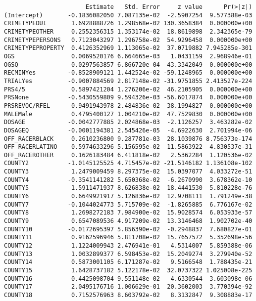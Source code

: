 \documentclass[
  letterpaper,
  DIV=11,
  numbers=noendperiod]{scrartcl}
\begin{document}
\begin{verbatim}
                       Estimate   Std. Error     z value      Pr(>|z|)
(Intercept)       -0.1836082050 7.087135e-02  -2.5907254  9.577388e-03
CRIMETYPEDUI       1.6928888726 1.298568e-02 130.3658384  0.000000e+00
CRIMETYPEOTHER     0.2552356315 1.353174e-02  18.8619898  2.342365e-79
CRIMETYPEPERSONS   0.7123043297 1.296758e-02  54.9296458  0.000000e+00
CRIMETYPEPROPERTY  0.4126352969 1.113065e-02  37.0719882 7.945285e-301
OGS                0.0069520176 6.664665e-03   1.0431159  2.968946e-01
OGSQ               0.0297563857 6.866720e-04  43.3342049  0.000000e+00
RECMINYes         -0.8528909121 1.442524e-02 -59.1248965  0.000000e+00
TRIALYes          -0.9007884569 2.817148e-02 -31.9751855 2.413527e-224
PRS4/5             0.5897421204 1.276206e-02  46.2105905  0.000000e+00
PRSNone           -0.5430559809 9.594326e-03 -56.6017874  0.000000e+00
PRSREVOC/RFEL      0.9491943978 2.484836e-02  38.1994827  0.000000e+00
MALEMale           0.4795400127 1.004210e-02  47.7529830  0.000000e+00
DOSAGE            -0.0042777885 2.024868e-03  -2.1126257  3.463282e-02
DOSAGEQ           -0.0001194381 2.545426e-05  -4.6922630  2.701994e-06
OFF_RACERBLACK     0.2610236800 9.287781e-03  28.1039876 8.756373e-174
OFF_RACERLATINO    0.5974633296 5.156595e-02  11.5863922  4.830537e-31
OFF_RACEROTHER     0.1626183484 6.411818e-02   2.5362284  1.120536e-02
COUNTY2           -1.0145125525 4.715457e-02 -21.5146182 1.136108e-102
COUNTY3            1.2479009459 8.297375e-02  15.0397077  4.033272e-51
COUNTY4           -0.3541141282 5.650368e-02  -6.2670990  3.678362e-10
COUNTY5            1.5911471937 8.626838e-02  18.4441530  5.810228e-76
COUNTY6            0.6649921917 5.126836e-02  12.9708111  1.791249e-38
COUNTY7           -0.1044024773 5.715709e-02  -1.8265885  6.776167e-02
COUNTY8            1.2698272183 7.984900e-02  15.9028574  6.053933e-57
COUNTY9            0.6547089536 4.917209e-02  13.3146468  1.902702e-40
COUNTY10          -0.0172695397 5.856390e-02  -0.2948837  7.680827e-01
COUNTY11           0.9162596946 5.811708e-02  15.7657572  5.352698e-56
COUNTY12           1.1224009943 2.476941e-01   4.5314007  5.859388e-06
COUNTY13           1.0032899377 6.598453e-02  15.2049274  3.279940e-52
COUNTY14           0.5873001105 6.171287e-02   9.5166548  1.788435e-21
COUNTY15           1.6428737182 5.122178e-02  32.0737322 1.025008e-225
COUNTY16           0.4425098704 9.551148e-02   4.6330544  3.603098e-06
COUNTY17           2.0495176716 1.006629e-01  20.3602003  3.770394e-92
COUNTY18           0.7152576963 8.603792e-02   8.3132847  9.308883e-17

\end{verbatim}
\end{document}
